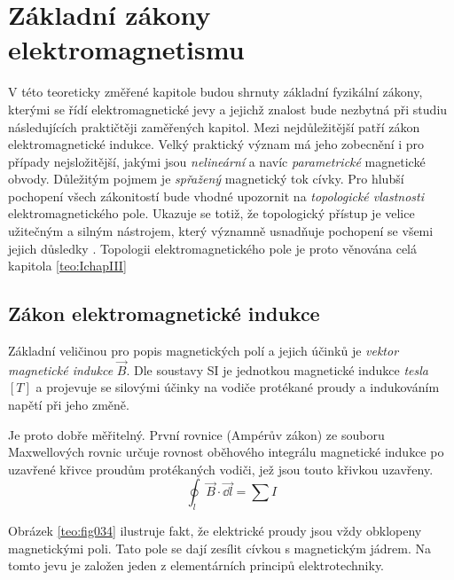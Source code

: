 \setchaptertoc
\chapter{Základní zákony elektromagnetismu}\label{teo:IchapII}
  V této teoreticky změřené kapitole budou shrnuty základní fyzikální zákony, kterými se řídí
  elektromagnetické jevy a jejichž znalost bude nezbytná při studiu následujících praktičtěji
  zaměřených kapitol. Mezi nejdůležitější patří zákon elektromagnetické indukce. Velký praktický
  význam má jeho zobecnění i pro případy nejsložitější, jakými jsou \emph{nelineární} a navíc
  \emph{parametrické} magnetické obvody. Důležitým pojmem je \emph{spřažený} magnetický tok cívky.
  Pro hlubší pochopení všech zákonitostí bude vhodné upozornit na \emph{topologické vlastnosti}
  elektromagnetického pole. Ukazuje se totiž, že topologický přístup je velice užitečným a silným
  nástrojem, který významně usnadňuje pochopení \wikiMaxwellEq se všemi jejich důsledky
  \cite[s.~6]{Patocka4}. Topologii elektromagnetického pole je proto věnována celá kapitola
  \ref{teo:IchapIII}
  
  \section{Zákon elektromagnetické indukce}\label{teo:IchapIIsecI}
    Základní veličinou pro popis magnetických polí a jejich účinků je \emph{vektor magnetické
    indukce} \(\vec{B}\). Dle soustavy SI je jednotkou magnetické indukce \emph{tesla} \([T]\) a
    projevuje se silovými účinky na vodiče protékané proudy a indukováním napětí při jeho změně.

    Je proto dobře měřitelný. První rovnice (Ampérův zákon) ze souboru Maxwellových rovnic určuje
    rovnost oběhového integrálu magnetické indukce po uzavřené křivce proudům protékaných vodiči,
    jež jsou touto křivkou uzavřeny.
    \begin{equation}\label{TEO:eq101}
      \oint_l \vec{B} \cdot \vec{\dd{l}} = \sum I
    \end{equation}
    

    Obrázek \ref{teo:fig034} ilustruje fakt, že elektrické proudy jsou vždy obklopeny 
    magnetickými poli. Tato pole se dají zesílit cívkou s magnetickým jádrem. Na tomto jevu je 
    založen jeden z elementárních principů elektrotechniky.    
       
